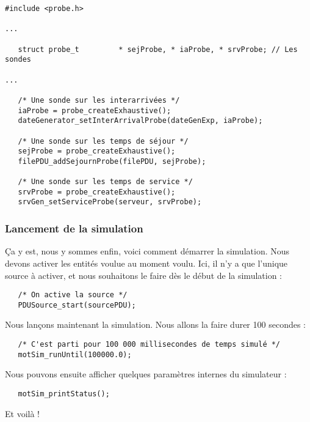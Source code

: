 \documentclass{article}
\begin{document}
\begin{verbatim}
#include <probe.h>

...

   struct probe_t         * sejProbe, * iaProbe, * srvProbe; // Les sondes

...

   /* Une sonde sur les interarrivées */
   iaProbe = probe_createExhaustive();
   dateGenerator_setInterArrivalProbe(dateGenExp, iaProbe);

   /* Une sonde sur les temps de séjour */
   sejProbe = probe_createExhaustive();
   filePDU_addSejournProbe(filePDU, sejProbe);

   /* Une sonde sur les temps de service */
   srvProbe = probe_createExhaustive();
   srvGen_setServiceProbe(serveur, srvProbe);
\end{verbatim}

%
\subsubsection{Lancement de la simulation}

   Ça y est, nous y sommes enfin, voici comment démarrer la
simulation. Nous devons activer les entités voulue au moment
voulu. Ici, il n'y a que l'unique source à activer, et nous souhaitons
le faire dès le début de la simulation :

\begin{verbatim}
   /* On active la source */
   PDUSource_start(sourcePDU);
\end{verbatim}

   Nous lançons maintenant la simulation. Nous allons la faire durer
100 secondes :

\begin{verbatim}
   /* C'est parti pour 100 000 millisecondes de temps simulé */
   motSim_runUntil(100000.0);
\end{verbatim}

   Nous pouvons ensuite afficher quelques paramètres internes du
simulateur :

\begin{verbatim}
   motSim_printStatus();
\end{verbatim}

   Et voilà !

%
\end{document}
